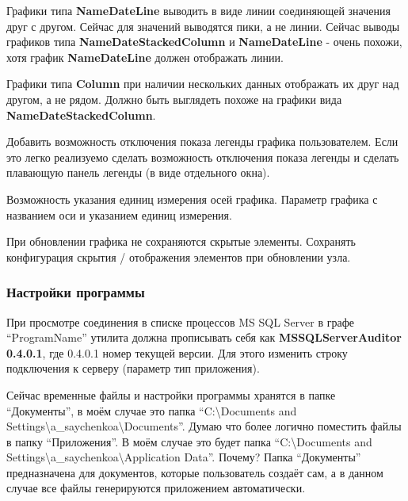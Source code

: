 \fi

Графики типа \textbf{NameDateLine} выводить в виде линии соединяющей значения друг с другом. Сейчас
для значений выводятся пики, а не линии. Сейчас выводы графиков типа \textbf{NameDateStackedColumn}
и \textbf{NameDateLine} - очень похожи, хотя график \textbf{NameDateLine} должен отображать линии.

\bigskip

Графики типа \textbf{Column} при наличии нескольких данных отображать их друг над другом, а не
рядом. Должно быть выглядеть похоже на графики вида \textbf{NameDateStackedColumn}.

\bigskip

Добавить возможность отключения показа легенды графика пользователем. Если это легко реализуемо
сделать возможность отключения показа легенды и сделать плавающую панель легенды (в виде отдельного
окна).

\iffalse

\bigskip

После скрытия элементов графика производить перемасштабирование осей \textbf{X}, \textbf{Y}, так как
для открытых данных масштаб уже не верный.

\fi

\iffalse

\bigskip

При включенной опции отображения осей выводить завершающую вертикальную или горизонтальную линии.

\fi

\bigskip

Возможность указания единиц измерения осей графика. Параметр графика с названием оси и указанием
единиц измерения.

\bigskip

При обновлении графика не сохраняются скрытые элементы. Сохранять конфигурация скрытия / отображения
элементов при обновлении узла.

\subsubsection{Настройки программы}

При просмотре соединения в списке процессов MS SQL Server в графе ``ProgramName'' утилита должна
прописывать себя как \textbf{MSSQLServerAuditor} \textbf{0.4.0.1}, где 0.4.0.1 номер текущей версии.
Для этого изменить строку подключения к серверу (параметр тип приложения).

\bigskip

Сейчас временные файлы и настройки программы хранятся в папке ``Документы'', в моём случае это папка
``C:{\textbackslash}Docu\-ments and
Set\-tings{\textbackslash}a\_sayche\-nkoa{\textbackslash}Docu\-ments''. Думаю что более логично
поместить файлы в папку ``Приложения''. В моём случае это будет папка
``C:{\textbackslash}Docu\-ments and
Set\-tings{\textbackslash}a\_sayche\-nkoa{\textbackslash}Appli\-cation Data''. Почему? Папка
``Документы'' предназначена для документов, которые пользователь создаёт сам, а в данном случае все
файлы генерируются приложением автоматически.

